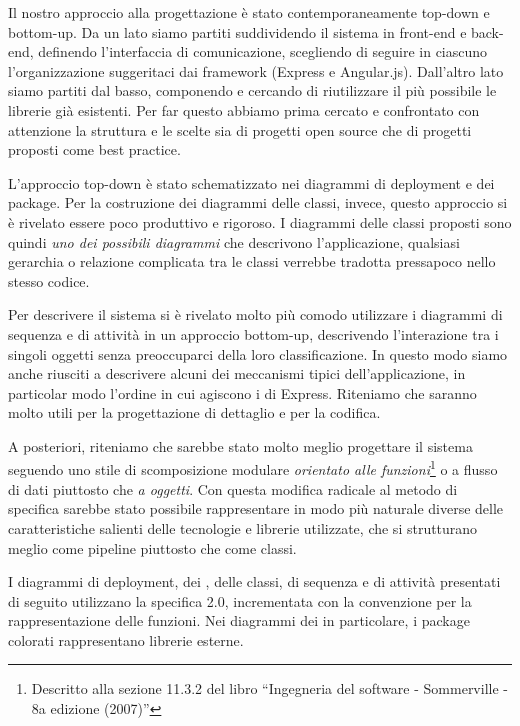 Il nostro approccio alla progettazione è stato contemporaneamente top-down e bottom-up. Da un lato siamo partiti suddividendo il sistema in front-end e back-end, definendo l'interfaccia di comunicazione, scegliendo di seguire in ciascuno l'organizzazione suggeritaci dai framework (Express e Angular.js). Dall'altro lato siamo partiti dal basso, componendo e cercando di riutilizzare il più possibile le librerie già esistenti. Per far questo abbiamo prima cercato e confrontato con attenzione la struttura e le scelte sia di progetti open source che di progetti proposti come best practice.

L'approccio top-down è stato schematizzato nei diagrammi di deployment e dei package. Per la costruzione dei diagrammi delle classi, invece, questo approccio si è rivelato essere poco produttivo e rigoroso. I diagrammi delle classi proposti sono quindi \emph{uno dei possibili diagrammi} che descrivono l'applicazione, qualsiasi gerarchia o relazione complicata tra le classi verrebbe tradotta pressapoco nello stesso codice.

Per descrivere il sistema si è rivelato molto più comodo utilizzare i diagrammi di sequenza e di attività in un approccio bottom-up, descrivendo l'interazione tra i singoli oggetti senza preoccuparci della loro classificazione. In questo modo siamo anche riusciti a descrivere alcuni dei meccanismi tipici dell'applicazione, in particolar modo l'ordine in cui agiscono i  di Express. Riteniamo che saranno molto utili per la progettazione di dettaglio e per la codifica.

A posteriori, riteniamo che sarebbe stato molto meglio progettare il sistema seguendo uno stile di scomposizione modulare \emph{orientato alle funzioni}\footnote{Descritto alla sezione 11.3.2 del libro ``Ingegneria del software - Sommerville - 8a edizione (2007)''} o a flusso di dati piuttosto che \emph{a oggetti}. Con questa modifica radicale al metodo di specifica sarebbe stato possibile rappresentare in modo più naturale diverse delle caratteristiche salienti delle tecnologie e librerie utilizzate, che si strutturano meglio come pipeline piuttosto che come classi.

I diagrammi di deployment, dei , delle classi, di sequenza e di attività presentati di seguito utilizzano la specifica  2.0, incrementata con la convenzione per la rappresentazione delle funzioni.
Nei diagrammi dei  in particolare, i package colorati rappresentano librerie esterne.


